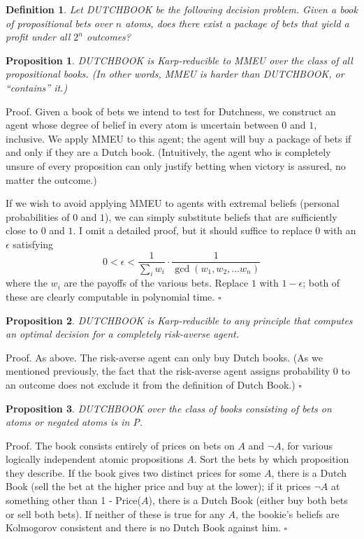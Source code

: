 \documentclass[letterpaper,12pt]{article}
\newtheorem{definition}{Definition}
\newtheorem{proposition}{Proposition}
\begin{document}
\begin{definition}
\label{dutchBook}
Let \emph{DUTCHBOOK} be the following decision problem. Given a book of propositional bets over $n$ atoms, does there exist a package of bets that yield a profit under all $2^n$ outcomes?
\end{definition}

\begin{proposition}
\label{dutchBookLeqMMEU}
DUTCHBOOK is Karp-reducible to MMEU over the class of all propositional books. (In other words, MMEU is harder than DUTCHBOOK, or ``contains'' it.)
\end{proposition}

Proof. Given a book of bets we intend to test for Dutchness, we construct an agent whose degree of belief in every atom is uncertain between $0$ and $1$, inclusive. We apply MMEU to this agent; the agent will buy a package of bets if and only if they are a Dutch book. (Intuitively, the agent who is completely unsure of every proposition can only justify betting when victory is assured, no matter the outcome.)

If we wish to avoid applying MMEU to agents with extremal beliefs (personal probabilities of $0$ and $1$), we can simply substitute beliefs that are sufficiently close to $0$ and $1$. I omit a detailed proof, but it should suffice to replace $0$ with an $\epsilon$ satisfying
$$0 < \epsilon < \frac{1}{\sum_i w_i} \cdot \frac{1}{\gcd(w_1, w_2, \ldots w_n)}$$
where the $w_i$ are the payoffs of the various bets. Replace $1$ with $1 - \epsilon$; both of these are clearly computable in polynomial time. $\square$

\begin{proposition}
\label{dutchBookLeqRiskAversion}
DUTCHBOOK is Karp-reducible to any principle that computes an optimal decision for a completely risk-averse agent.
\end{proposition}

Proof. As above. The risk-averse agent can only buy Dutch books. (As we mentioned previously, the fact that the risk-averse agent assigns probability 0 to an outcome does not exclude it from the definition of Dutch Book.) $\square$

\begin{proposition}
\label{dutchBookAtomsP}
DUTCHBOOK over the class of books consisting of bets on atoms or negated atoms is in P.
\end{proposition}

Proof. The book consists entirely of prices on bets on $A$ and $\neg A$, for various logically independent atomic propositions $A$. Sort the bets by which proposition they describe. If the book gives two distinct prices for some $A$, there is a Dutch Book (sell the bet at the higher price and buy at the lower); if it prices $\neg A$ at something other than 1 - Price($A$), there is a Dutch Book (either buy both bets or sell both bets). If neither of these is true for any $A$, the bookie's beliefs are Kolmogorov consistent and there is no Dutch Book against him. $\square$
\end{document}
